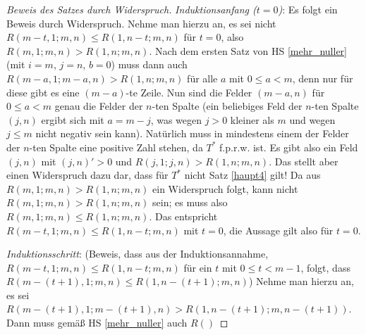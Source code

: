 \begin{proof}[Beweis des Satzes durch Widerspruch]
    \textit{Induktionsanfang ($t=0$)}: Es folgt ein Beweis durch Widerspruch. Nehme man hierzu an, es sei nicht 
    $R(m-t, 1; m, n)\leq R(1, n-t; m, n)$ für $t=0$, also $R(m, 1; m, n)>R(1, n; m, n)$. Nach dem ersten Satz von 
    HS \ref{mehr_nuller} (mit $i=m$, $j=n$, $b=0$) muss dann auch $R(m-a, 1; m-a, n) > R(1, n; m, n)$ für alle 
    $a$ mit $0\leq a<m$, denn nur für diese gibt es eine $(m-a)$-te Zeile. Nun sind die Felder $(m-a, n)$ für $0\leq 
    a<m$ genau die Felder der $n$-ten Spalte (ein beliebiges Feld der $n$-ten Spalte $(j, n)$ ergibt sich mit $a=m-j$, 
    was wegen $j>0$ kleiner als $m$ und wegen $j\leq m$ nicht negativ sein kann). Natürlich muss in mindestens einem 
    der Felder der $n$-ten Spalte eine positive Zahl stehen, da $T^*$ f.p.r.w. ist. Es gibt also ein Feld $(j, n)$ 
    mit $(j, n)'>0$ und $R(j, 1; j, n)>R(1, n; m, n)$. Das stellt aber einen Widerspruch dazu dar, dass für $T^*$ nicht 
    Satz \ref{haupt4} gilt! Da aus $R(m, 1; m, n)>R(1, n; m, n)$ ein Widerspruch folgt, kann nicht $R(m, 1; m, n)>
    R(1, n; m, n)$ sein; es muss also $R(m, 1; m, n)\leq R(1, n; m, n)$. Das entspricht $R(m-t, 1; m, n)\leq 
    R(1, n-t; m, n)$ mit $t=0$, die Aussage gilt also für $t=0$.

    \textit{Induktionsschritt}: (Beweis, dass aus der Induktionsannahme, $R(m-t, 1; m, n)\leq R(1, n-t; m, n)$ für 
    ein $t$ mit $0\leq t<m-1$, folgt, dass $R(m-(t+1), 1; m, n)\leq R(1, n-(t+1); m, n)$) Nehme man hierzu an, es sei 
    $R(m-(t+1), 1; m-(t+1), n)>R(1, n-(t+1); m, n-(t+1))$. Dann muss gemäß HS \ref{mehr_nuller} auch 
    $R()$





\end{proof}
